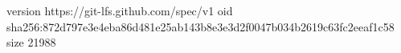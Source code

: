 version https://git-lfs.github.com/spec/v1
oid sha256:872d797e3e4eba86d481e25ab143b8e3e3d2f0047b034b2619c63fc2eeaf1c58
size 21988
